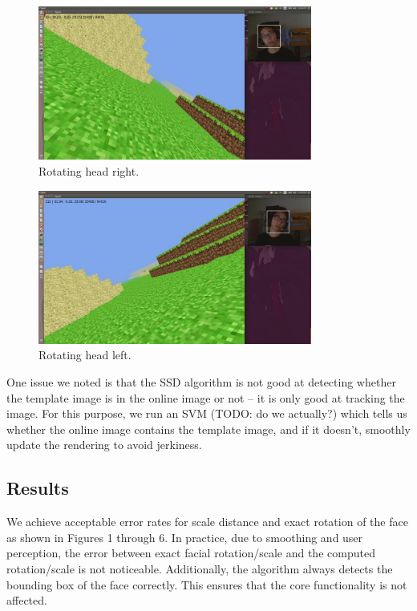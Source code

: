 \documentclass[10pt,twocolumn,letterpaper]{article}
\begin{document}
\begin{figure}[ht!]
\centering
\includegraphics[width=90mm]{rotation_left.jpg}
\caption{Rotating head right.\label{overflow}}
\end{figure}

\begin{figure}[ht!]
\centering
\includegraphics[width=90mm]{rotation_right.jpg}
\caption{Rotating head left.\label{overflow}}
\end{figure}

One issue we noted is that the SSD algorithm is not good at detecting whether the template
image is in the online image or not -- it is only good at tracking the image. For this
purpose, we run an SVM (TODO: do we actually?) which tells us whether the online image contains the template image,
and if it doesn't, smoothly update the rendering to avoid jerkiness.

\subsection*{Results}
We achieve acceptable error rates for scale distance and exact rotation of the face as shown in Figures 1 through 6. In practice, due to smoothing and user perception, the error between exact facial rotation/scale and the computed rotation/scale is not noticeable. Additionally, the algorithm always detects the bounding box of the face correctly. This ensures that the core functionality is not affected.
\end{document}
